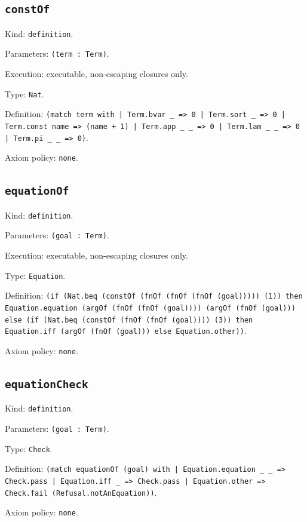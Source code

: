 \documentclass[11pt]{article}
\begin{document}
\subsection*{\texttt{constOf}}
\noindent Kind: \texttt{definition}.\par
\noindent Parameters: \texttt{(term : Term)}.\par
\noindent Execution: executable, non-escaping closures only.\par
\noindent Type: \texttt{Nat}.\par
\noindent Definition: \texttt{(match term with | Term.bvar \_ => 0 | Term.sort \_ => 0 | Term.const name => (name + 1) | Term.app \_ \_ => 0 | Term.lam \_ \_ => 0 | Term.pi \_ \_ => 0)}.\par
\noindent Axiom policy: \texttt{none}.\par
\subsection*{\texttt{equationOf}}
\noindent Kind: \texttt{definition}.\par
\noindent Parameters: \texttt{(goal : Term)}.\par
\noindent Execution: executable, non-escaping closures only.\par
\noindent Type: \texttt{Equation}.\par
\noindent Definition: \texttt{(if (Nat.beq (constOf (fnOf (fnOf (fnOf (goal))))) (1)) then Equation.equation (argOf (fnOf (fnOf (goal)))) (argOf (fnOf (goal))) else (if (Nat.beq (constOf (fnOf (fnOf (goal)))) (3)) then Equation.iff (argOf (fnOf (goal))) else Equation.other))}.\par
\noindent Axiom policy: \texttt{none}.\par
\subsection*{\texttt{equationCheck}}
\noindent Kind: \texttt{definition}.\par
\noindent Parameters: \texttt{(goal : Term)}.\par
\noindent Type: \texttt{Check}.\par
\noindent Definition: \texttt{(match equationOf (goal) with | Equation.equation \_ \_ => Check.pass | Equation.iff \_ => Check.pass | Equation.other => Check.fail (Refusal.notAnEquation))}.\par
\noindent Axiom policy: \texttt{none}.\par
\end{document}

